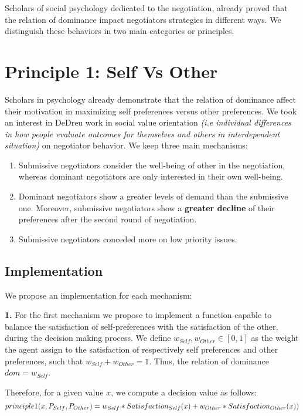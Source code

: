 \documentclass{article}
\begin{document}
\par Scholars of social psychology dedicated to the negotiation, already proved that the relation of dominance impact negotiators strategies in different ways. We distinguish these behaviors in two main categories or principles.



\section{Principle 1: Self Vs Other}
Scholars in psychology already demonstrate that the relation of dominance affect their motivation in maximizing self preferences versus other preferences. We took an interest in DeDreu work in social value orientation \textit{(i.e  individual differences in	how people evaluate outcomes for themselves and others	in interdependent situation)} on negotiator behavior. We keep three main mechanisms:
\begin{enumerate}
	\item Submissive negotiators consider the well-being of other in the negotiation, whereas dominant negotiators are only interested in their own well-being.
	\item Dominant negotiators show a greater levels of demand than the submissive one. Moreover, submissive negotiators show a \textbf{greater decline} of their preferences after the second round of negotiation. 
	\item Submissive negotiators conceded more on low priority issues.
\end{enumerate}   




\subsection{Implementation}
We propose an implementation for each mechanism:

\textbf{1.} For the first mechanism we propose to implement a function capable to balance the satisfaction of self-preferences with the satisfaction of the other, during the decision making process.
We define $w_{Self}, w_{Other}  \in [0, 1]$ as the weight the agent assign to the satisfaction of respectively  self preferences and other preferences, such that $w_{Self}+ w_{Other} = 1$. Thus, the relation of dominance $dom = w_{Self}$.

Therefore, for a given value $x$,  we compute a decision value as follows:
\begin{dmath}
$$principle1(x,P_{Self},P_{Other}) = w_{Self} * Satisfaction_{Self}(x) + w_{Other} * Satisfaction_{Other}(x))$$
\end{dmath}
\end{document}
